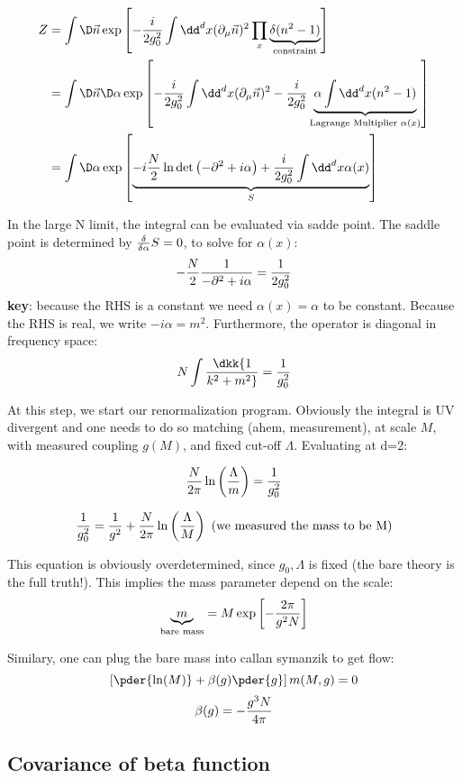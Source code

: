 \documentclass[11pt]{scrartcl}
\begin{document}
\begin{align}
	 Z&= \int \D \vec{n} \exp \left[ -{i \over 2 g_0^2} \int \dd^d x (\partial_\mu \vec{n})^2 \prod_{x} \underbrace{\delta(n^2 - 1)}_{\text{constraint}} \right] \\
	 & =  \int \D \vec{n} \D \alpha \exp \left[ -{i \over 2 g_0^2} \int \dd^d x (\partial_\mu \vec{n})^2 - {i \over 2 g_0^2} \underbrace{\alpha \int \dd^d x (n^2 -1)}_{\text{Lagrange Multiplier  } \alpha(x)} \right]  \\
	 & = \int \D \alpha  \exp \left[ \underbrace{-i {N \over 2} \ln \mathrm{det} \left(-\partial^2 + i \alpha \right) +{i \over 2 g_0^2} \int \dd^d x \alpha(x)}_{S}  \right]
	 \end{align}

In the large N limit, the integral can be evaluated via sadde point.  The saddle point is determined by ${\delta \over \delta \alpha} S = 0$, to solve for $\alpha(x)$:
\[ -{N \over 2} {1 \over -\partial^2 + i \alpha} = {1 \over 2 g_0 ^ 2} \]
\textbf{key}: because the RHS is a constant we need $\alpha(x) = \alpha$ to be constant.  Because the RHS is real, we write $-i \alpha  = m^2$.  Furthermore, the operator is diagonal in frequency space:
\[ N \int \dkk {1 \over k^2 + m^2} = {1 \over g_0^2} \]

At this step, we start our renormalization program.  Obviously the integral is UV divergent and one needs to do so matching (ahem, measurement), at scale $M$, with measured coupling $g(M)$, and fixed cut-off $\Lambda$.  Evaluating at d=2:

\[{N \over 2 \pi} \ln \left({\Lambda \over m} \right) = {1 \over g_0^2}\]

\[ {1 \over g_0^2} = {1 \over g^2} + {N \over 2 \pi} \ln \left({\Lambda \over M} \right) \text{ (we measured the mass to be M)} \]

This equation is obviously overdetermined, since $g_0, \Lambda$ is fixed (the bare theory is the full truth!).  This implies the mass parameter depend on the scale:
\[ \underbrace{m}_{\text{bare mass}} = M \exp \left[-{2 \pi \over g^2 N} \right]\]

Similary, one can plug the bare mass into callan symanzik to get flow:
\[ \left[\pder{\ln (M)} + \beta(g) \pder{g} \right]m(M, g) = 0 \]
\[\beta(g) = -{g^3 N \over 4 \pi} \]

\subsection{Covariance of beta function}
\end{document}
